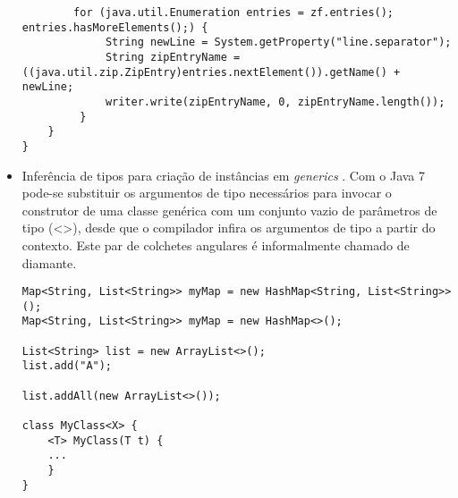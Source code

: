 \begin{itemize}
\begin{lstlisting}
		for (java.util.Enumeration entries = zf.entries(); entries.hasMoreElements();) {
			 String newLine = System.getProperty("line.separator");
			 String zipEntryName = ((java.util.zip.ZipEntry)entries.nextElement()).getName() + newLine;
			 writer.write(zipEntryName, 0, zipEntryName.length());
		 }
	}
}

\end{lstlisting}
		  
		  \clearpage
		  \item Inferência de tipos para criação de instâncias em {\it generics} \cite{OracleGenerics,Bracha:1998:MFS:286942.286957,Parnin:2011:JGA:1985441.1985446}. Com o Java 7 pode-se substituir os argumentos de tipo necessários para invocar o construtor de uma classe genérica com um conjunto vazio de parâmetros de tipo (<>), desde que o compilador infira os argumentos de tipo a partir do contexto. Este par de colchetes angulares é informalmente chamado de diamante.
  
  

\begin{lstlisting}
Map<String, List<String>> myMap = new HashMap<String, List<String>>();
Map<String, List<String>> myMap = new HashMap<>();
	
List<String> list = new ArrayList<>();
list.add("A");

list.addAll(new ArrayList<>());
	
class MyClass<X> {
	<T> MyClass(T t) {
	...
	}
}
\end{lstlisting}
	 
	  \end{itemize}
	  
	  
